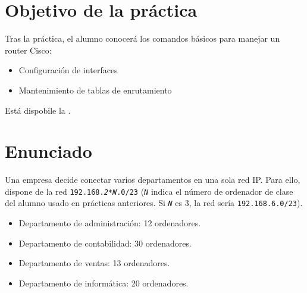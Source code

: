 
\usepackage{eurosym}
\usepackage{needspace}


\renewcommand{\hmwkTitle}{Práctica enrutamiento IP}
\renewcommand{\hmwkClass}{Planificación y Administración de Redes}

\usepackage{blindtext}






\primerapagina

\setlength{\parindent}{1em}
\setlength{\parskip}{1em}

\section{Objetivo de la práctica}
Tras la práctica, el alumno conocerá los comandos básicos para manejar un router Cisco:
\begin{itemize}
\item Configuración de interfaces
\item Mantenimiento de tablas de enrutamiento
\end{itemize}

Está dispobile la .

\section{Enunciado}
Una empresa decide conectar varios departamentos en una sola red IP. Para ello, dispone de la red \texttt{192.168.\textit{2*N}.0/23} (\texttt{\textit{N}} indica el número de ordenador de clase del alumno usado en prácticas anteriores. Si \texttt{\textit{N}} es 3, la red sería \texttt{192.168.6.0/23}).
\begin{itemize}
\item Departamento de administración: 12 ordenadores.
\item Departamento de contabilidad: 30 ordenadores.
\item Departamento de ventas: 13 ordenadores.
\item Departamento de informática: 20 ordenadores.
\end{itemize}

